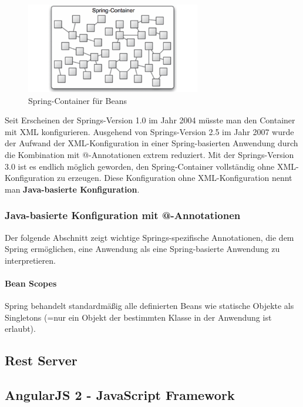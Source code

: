 \begin{figure}[H]
\centering
\includegraphics[width=3.0in]{resources/container}
\caption[Spring-Container für Beans]{Spring-Container für Beans}
\label{img:container}
\end{figure}
Seit Erscheinen der Springs-Version 1.0 im Jahr 2004 müsste man den Container mit XML konfigurieren. Ausgehend von Springs-Version 2.5 im Jahr 2007 wurde der Aufwand der XML-Konfiguration in einer Spring-basierten Anwendung durch die Kombination mit @-Annotationen extrem reduziert. Mit der Springs-Version 3.0 ist es endlich möglich geworden, den Spring-Container vollständig ohne XML-Konfiguration zu erzeugen. Diese Konfiguration ohne XML-Konfiguration nennt man \textbf{Java-basierte Konfiguration}.

\subsubsection{Java-basierte Konfiguration mit {@-}Annotationen}
Der folgende Abschnitt zeigt wichtige Springs-spezifische Annotationen, die dem Spring ermöglichen, eine Anwendung als eine Spring-basierte Anwendung zu interpretieren.

\paragraph{Bean Scopes}
Spring behandelt standardmäßig alle definierten Beans wie statische Objekte als Singletons (=nur ein Objekt der bestimmten Klasse in der Anwendung ist erlaubt).

\subsection{Rest Server}
\subsection{AngularJS 2 - JavaScript Framework}

